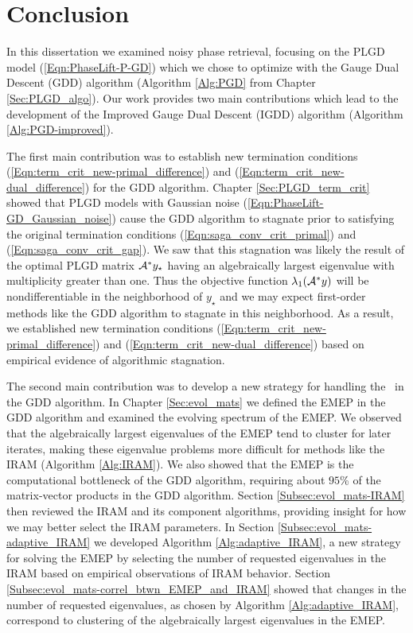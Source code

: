 \chapter{Conclusion}			\label{Sec:Conclusion}


In this dissertation we examined noisy phase retrieval, focusing on the PLGD model (\ref{Eqn:PhaseLift-P-GD}) which we chose to optimize with the Gauge Dual Descent (GDD) algorithm (Algorithm \ref{Alg:PGD} from Chapter \ref{Sec:PLGD_algo}).
Our work provides two main contributions which lead to the development of the Improved Gauge Dual Descent (IGDD) algorithm (Algorithm \ref{Alg:PGD-improved}).


The first main contribution was to establish new termination conditions (\ref{Eqn:term_crit_new-primal_difference}) and (\ref{Eqn:term_crit_new-dual_difference}) for the GDD algorithm.
Chapter \ref{Sec:PLGD_term_crit} showed that PLGD models with Gaussian noise (\ref{Eqn:PhaseLift-GD_Gaussian_noise}) cause the GDD algorithm to stagnate prior to satisfying the original termination conditions (\ref{Eqn:saga_conv_crit_primal}) and (\ref{Eqn:saga_conv_crit_gap}).  
We saw that this stagnation was likely the result of the optimal PLGD matrix ${\mathcal A}^*y_\star$ having an algebraically largest eigenvalue with multiplicity greater than one.
Thus the objective function $\lambda_1({\mathcal A}^*y)$ will be nondifferentiable in the neighborhood of $y_\star$ and we may expect first-order methods like the GDD algorithm to stagnate in this neighborhood.
As a result, we established new termination conditions (\ref{Eqn:term_crit_new-primal_difference}) and (\ref{Eqn:term_crit_new-dual_difference}) based on empirical evidence of algorithmic stagnation.


The second main contribution was to develop a new strategy for handling the \emep \ in the GDD algorithm.
In Chapter \ref{Sec:evol_mats} we defined the EMEP in the GDD algorithm and examined the evolving spectrum of the EMEP.
We observed that the algebraically largest eigenvalues of the EMEP tend to cluster for later iterates, making these eigenvalue problems more difficult for methods like the IRAM (Algorithm \ref{Alg:IRAM}).
We also showed that the EMEP is the computational bottleneck of the GDD algorithm, requiring about $95$\% of the matrix-vector products in the GDD algorithm.
Section \ref{Subsec:evol_mats-IRAM} then reviewed the IRAM and its component algorithms, providing insight for how we may better select the IRAM parameters.
In Section \ref{Subsec:evol_mats-adaptive_IRAM} we developed Algorithm \ref{Alg:adaptive_IRAM}, a new strategy for solving the EMEP by selecting the number of requested eigenvalues in the IRAM based on empirical observations of IRAM behavior.
Section \ref{Subsec:evol_mats-correl_btwn_EMEP_and_IRAM} showed that changes in the number of requested eigenvalues, as chosen by Algorithm \ref{Alg:adaptive_IRAM}, correspond to clustering of the algebraically largest eigenvalues in the EMEP.


